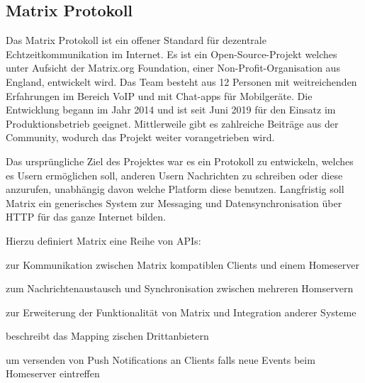     \subsection{Matrix Protokoll}\label{subsec:matrix-protokoll}
    Das Matrix Protokoll ist ein offener Standard für dezentrale Echtzeitkommunikation im Internet.
    Es ist ein Open-Source-Projekt welches unter Aufsicht der Matrix.org Foundation, einer Non-Profit-Organisation aus England, entwickelt wird.
    Das Team besteht aus 12 Personen mit weitreichenden Erfahrungen im Bereich VoIP und mit Chat-apps für Mobilgeräte.
    Die Entwicklung begann im Jahr 2014 und ist seit Juni 2019 für den Einsatz im Produktionsbetrieb geeignet.
    Mittlerweile gibt es zahlreiche Beiträge aus der Community, wodurch das Projekt weiter vorangetrieben wird.
    ~\cite{matrixfaq}

    Das ursprüngliche Ziel des Projektes war es ein Protokoll zu entwickeln, welches es Usern ermöglichen soll, anderen Usern Nachrichten zu schreiben oder diese anzurufen, unabhängig davon welche Platform diese benutzen.
    Langfristig soll Matrix ein generisches System zur Messaging und Datensynchronisation über HTTP für das ganze Internet bilden.
    ~\cite{matrixfaq}

    Hierzu definiert Matrix eine Reihe von APIs:
    \begin{description}[leftmargin=!,labelwidth=5.5cm]
        \item [Client-Server-API\footnotemark]  zur Kommunikation zwischen Matrix kompatiblen Clients und einem Homeserver
        \item [Server-Server-API\footnotemark]  zum Nachrichtenaustausch und Synchronisation zwischen mehreren Homservern
        \item [Application-Service-API\footnotemark]  zur Erweiterung der Funktionalität von Matrix und Integration anderer Systeme
        \item [Identity-Service-API\footnotemark]  beschreibt das Mapping zischen Drittanbietern
        \item [Push-Gateway-API\footnotemark]  um versenden von Push Notifications an Clients falls neue Events beim Homeserver eintreffen
    \end{description}



